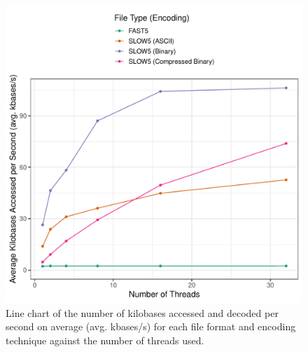 \begin{figure}[h]
    \includegraphics[width=\linewidth]{../../../plot/gpgpu_read_time_thread.pdf}
    \caption[Line chart of the number of kilobases accessed and decoded per second on average for each file format and encoding technique against the number of threads used.]{Line chart of the number of kilobases accessed and decoded per second on average (avg. kbases/s) for each file format and encoding technique against the number of threads used.}
    \label{fig:time}
\end{figure}
